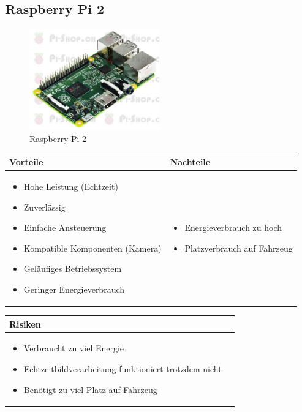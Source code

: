 \pagebreak


\subsection{Raspberry Pi 2}

\begin{figure}[h!]%
\centering
\includegraphics[width=0.5\textwidth]{fig/PI2.jpg}
\caption{Raspberry Pi 2}
\label{fig:PI2}
\end{figure}

\begin{table}[h]
\begin{tabular}{p{} | p{}}


 \textbf{Vorteile} & \textbf{Nachteile} \\ \hline
	 
\begin{itemize}
\item Hohe Leistung (Echtzeit)
\item Zuverlässig
\item Einfache Ansteuerung
\item Kompatible Komponenten (Kamera)
\item Geläufiges Betriebssystem
\item Geringer Energieverbrauch
\end{itemize}

 
 &
 
\begin{itemize}
\item Energieverbrauch zu hoch
\item Platzverbrauch auf Fahrzeug
\end{itemize}

\end{tabular}
\end{table}

\begin{table}[h]
\begin{tabular}{p{}p{}}


 \textbf{Risiken} & \\ \hline
	 
\begin{itemize}
\item Verbraucht zu viel Energie
\item Echtzeitbildverarbeitung funktioniert trotzdem nicht
\item Benötigt zu viel Platz auf Fahrzeug
\end{itemize}


 
\end{tabular}
\end{table}

